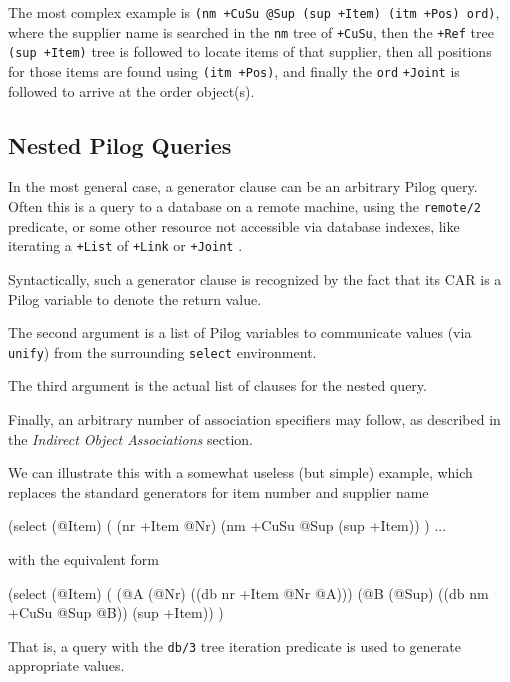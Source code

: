 The most complex example is
\texttt{(nm +CuSu @Sup (sup +Item) (itm +Pos) ord)}, where the supplier name is
searched in the \texttt{nm} tree of \texttt{+CuSu}, then the \texttt{+Ref} tree \texttt{(sup +Item)}
tree is followed to locate items of that supplier, then all positions
for those items are found using \texttt{(itm +Pos)}, and finally the \texttt{ord}
\texttt{+Joint} is followed to arrive at the order object(s).

 
\subsection{Nested Pilog Queries}
\label{sec:select-pred-nested-pilog-queries}


In the most general case, a generator clause can be an arbitrary Pilog
query. Often this is a query to a database on a remote machine, using
the \texttt{remote/2} predicate, or some other resource not accessible via
database indexes, like iterating a \texttt{+List} of \texttt{+Link}  or \texttt{+Joint} .

Syntactically, such a generator clause is recognized by the fact that
its CAR is a Pilog variable to denote the return value.

The second argument is a list of Pilog variables to communicate values
(via \texttt{unify}) from the surrounding \texttt{select} environment.

The third argument is the actual list of clauses for the nested query.

Finally, an arbitrary number of association specifiers may follow, as
described in the \emph{Indirect Object Associations}
section.

We can illustrate this with a somewhat useless (but simple) example,
which replaces the standard generators for item number and supplier name


\begin{wideverbatim}
(select (@Item)
   (
      (nr +Item @Nr)
      (nm +CuSu @Sup (sup +Item))
   )
   ...
\end{wideverbatim}

with the equivalent form


\begin{wideverbatim}
(select (@Item)
   (
      (@A (@Nr) ((db nr +Item @Nr @A)))
      (@B (@Sup) ((db nm +CuSu @Sup @B)) (sup +Item))
   )
\end{wideverbatim}

That is, a query with the \texttt{db/3} tree iteration predicate is used to
generate appropriate values.

